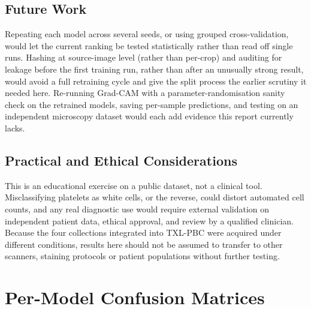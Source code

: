 \documentclass[11pt,a4paper]{article}
\begin{document}
\subsection{Future Work}

Repeating each model across several seeds, or using grouped cross-validation, would let the current ranking be tested statistically rather than read off single runs. Hashing at source-image level (rather than per-crop) and auditing for leakage before the first training run, rather than after an unusually strong result, would avoid a full retraining cycle and give the split process the earlier scrutiny it needed here. Re-running Grad-CAM with a parameter-randomisation sanity check on the retrained models, saving per-sample predictions, and testing on an independent microscopy dataset would each add evidence this report currently lacks.

\subsection{Practical and Ethical Considerations}

This is an educational exercise on a public dataset, not a clinical tool. Misclassifying platelets as white cells, or the reverse, could distort automated cell counts, and any real diagnostic use would require external validation on independent patient data, ethical approval, and review by a qualified clinician. Because the four collections integrated into TXL-PBC were acquired under different conditions, results here should not be assumed to transfer to other scanners, staining protocols or patient populations without further testing.

\FloatBarrier
\clearpage
\appendix
{}

\clearpage

\titleformat{\section}{\normalfont\Large\bfseries}{\thesection}{0.75em}{}

\section{Per-Model Confusion Matrices}\label{app:cm}
\end{document}
